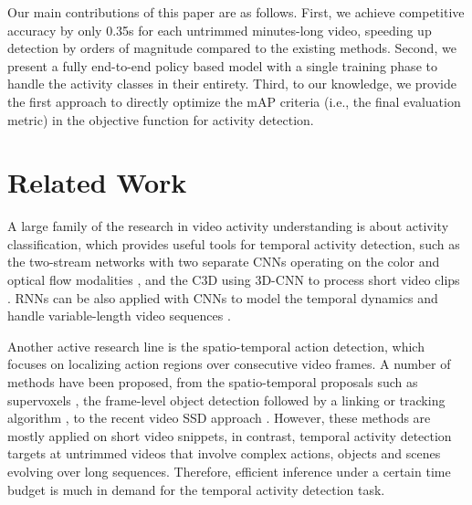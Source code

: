 \documentclass{bmvc2k}
\begin{document}
Our main contributions of this paper are as follows. First,
we achieve competitive accuracy by only 0.35s for each untrimmed minutes-long video, speeding up detection by orders of magnitude compared to the existing methods. Second, we present a fully end-to-end policy based model with a single training phase to handle the activity classes in their entirety. Third, to our knowledge, we provide the first approach to directly optimize the mAP criteria (i.e., the final evaluation metric) in the objective function for activity detection. 

\section{Related Work}
\label{sec:related-work}

A large family of the research in video activity understanding is about activity classification, which provides useful tools for temporal activity detection, such as the two-stream networks with two separate CNNs operating on the color and optical flow modalities \cite{two-stream}, and the C3D using 3D-CNN to process short video clips \cite{c3d}. RNNs can be also applied with CNNs to model the temporal dynamics and handle variable-length video sequences \cite{prernn}.    

Another active research line is the spatio-temporal action detection, which focuses on localizing action regions over consecutive video frames. A number of methods have been proposed, from the spatio-temporal proposals such as supervoxels \cite{mshah}, the frame-level object detection followed by a linking or tracking algorithm \cite{action-tube}, to the recent video SSD approach \cite{video-ssd}. However, these methods are mostly applied on short video snippets, in contrast, temporal activity detection targets at untrimmed videos that involve complex actions, objects and scenes evolving over long sequences. Therefore, efficient inference under a certain time budget is much in demand for the temporal activity detection task. 
\end{document}
